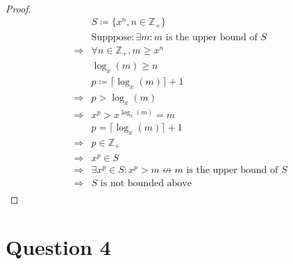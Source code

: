 \documentclass{article}
\begin{document}
~

\begin{proof}
    \begin{align*}
        &S\coloneqq\{x^n,n\in\mathbb{Z} _+\}\\
        &\text{Supppose}:\exists m:m\text{ is the upper bound of }S\\
        \Rightarrow&\forall n\in\mathbb{Z} _+,m\geqslant x^n\\
        &\log_{x}(m)\geqslant n\\
        &p\coloneqq\lceil\log_{x}(m) \rceil +1\\
        \Rightarrow&p>\log_{x}(m)\\
        \Rightarrow&x^p>x^{\log_{x}(m)}=m\\
        &p=\lceil\log_{x}(m) \rceil +1\\
        \Rightarrow&p\in\mathbb{Z} _+\\
        \Rightarrow&x^p\in S\\
        \Rightarrow&\exists x^p\in S:x^p>m\nleftrightarrow m\text{ is the upper bound of }S\\
        \Rightarrow&S\text{ is not bounded above}\\
    \end{align*}
\end{proof}

\newpage

\section*{Question 4}

~
\end{document}

